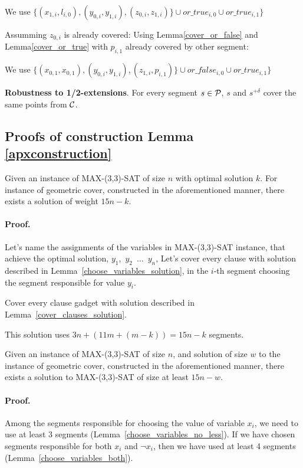 We use 
$\{ (x_{1, i}, l_{i, 0}), (y_{0, i}, y_{1, i}),
(z_{0, i}, z_{1, i}) \} \cup or\_true_{i, 0} \cup or\_true_{i, 1}\}$

Assumming $z_{0, i}$ is already covered:
Using Lemma\ref{cover_or_false} and Lemma\ref{cover_or_true} with $p_{i, 1}$ already covered by other segment:

We use 
$\{ (x_{0, 1}, x_{0, 1}), (y_{0, i}, y_{1, i}),
(z_{1, i}, p_{i, 1}) \} \cup or\_false_{i, 0} \cup or\_true_{i, 1}\}$


\begin{lemma}
\textbf{Robustness to 1/2-extensions}. For every segment $s \in \mathcal{P}$,
$s$ and $s^{+\delta}$ cover the same points from $\mathcal{C}$.
\end{lemma}

\subsection{Proofs of construction Lemma \ref{apxconstruction}}
\begin{lemma}
	\label{construction_correctness}
	Given an instance of MAX-(3,3)-SAT of size $n$
	with optimal solution $k$.
	For instance of geometric cover, constructed
	in the aforementioned manner, 
	there exists a solution of weight $15n - k$.
\end{lemma}
\paragraph{Proof.}
Let's name the assignments of the variables in MAX-(3,3)-SAT instance,
that achieve the optimal solution,
$y_1$,~$y_2$~$\ldots$~$y_n$,
Let's cover every clause with solution described in
Lemma~\ref{choose_variables_solution},
in the $i$-th segment choosing the segment responsible for value $y_i$.

Cover every clause gadget with solution described in
Lemma~\ref{cover_clauses_solution}.

This solution uses $3n + (11m + (m-k)) = 15n - k$ segments.

\begin{lemma}
	\label{construction_completness}
	Given an instance of MAX-(3,3)-SAT of size $n$,
	and solution of size $w$ to the instance of geometric cover,
	constructed in the aforementioned manner, 
	there exists a solution to MAX-(3,3)-SAT of size at least $15n - w$.
\end{lemma}
\paragraph{Proof.}
Among the segments responsible for choosing the value of variable $x_i$,
we need to use at least 3 segments (Lemma~\ref{choose_variables_no_less}).
If we have chosen segments responsible for both $x_i$ and $\neg x_i$,
then we have used at least 4 segments (Lemma~\ref{choose_variables_both}).

